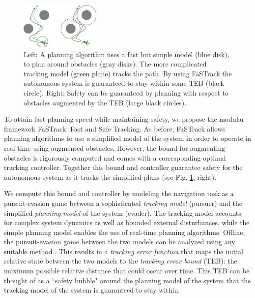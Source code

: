  \begin{figure}
 	\centering
 	\includegraphics[width=0.35\textwidth]{fig/chasing}
 	\caption{Left: A planning algorithm uses a fast but simple model (blue disk), to plan around obstacles (gray disks). The more complicated tracking model (green plane) tracks the path. By using FaSTrack the autonomous system is guaranteed to stay within some TEB (black circle). Right: Safety can be guaranteed by planning with respect to obstacles augmented by the TEB (large black circles).}
 	\label{fig:chasing}
 \end{figure}

To attain fast planning speed while maintaining safety, we propose the modular framework FaSTrack: Fast and Safe Tracking.  As before, FaSTrack allows planning algorithms to use a simplified model of the system in order to operate in real time using augmented obstacles.  However, the bound for augmenting obstacles is rigorously computed and comes with a corresponding optimal tracking controller. Together this bound and controller guarantee safety for the autonomous system as it tracks the simplified plans (see Fig. \ref{fig:chasing}, right).  

We compute this bound and controller by modeling the navigation task as a pursuit-evasion game between a sophisticated \textit{tracking model} (pursuer) and the simplified \textit{planning model} of the system (evader). 
The tracking model accounts for complex system dynamics as well as bounded external disturbances, while the simple planning model enables the use of real-time planning algorithms. 
Offline, the pursuit-evasion game between the two models can be analyzed using any suitable method \cite{Mitchell05, SinghChenEtAl2018, royo2018classification}. 
This results in a \textit{tracking error function} that maps the initial relative state between the two models to the \textit{tracking error bound} (TEB): the maximum possible relative distance that could occur over time. 
This TEB can be thought of as a ``safety bubble" around the planning model of the system that the tracking model of the system is guaranteed to stay within.

